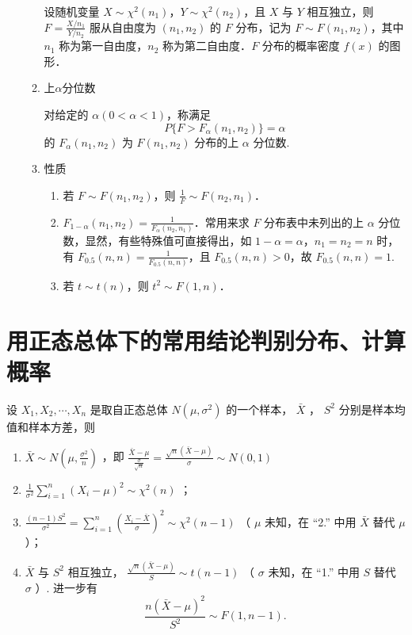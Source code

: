 \begin{enumerate}
\begin{enumerate}
                    设随机变量 $X \sim \chi^2(n_1)$，$Y \sim \chi^2(n_2)$，且 $X$ 与 $Y$ 相互独立，则 $F = \frac{X / n_1}{Y / n_2}$ 服从自由度为 $(n_1, n_2)$ 的 $F$ 分布，记为 $F \sim F(n_1, n_2)$，其中 $n_1$ 称为第一自由度，$n_2$ 称为第二自由度．$F$ 分布的概率密度 $f(x)$ 的图形．
              \item 上$\alpha$分位数

                    对给定的 $\alpha (0 < \alpha < 1)$，称满足
                    $$P\{F > F_\alpha(n_1, n_2)\} = \alpha$$
                    的 $F_\alpha(n_1, n_2)$ 为 $F(n_1, n_2)$ 分布的上 $\alpha$ 分位数.
              \item 性质
                    \begin{enumerate}
                        \item 若 $F \sim F(n_1, n_2)$，则 $\frac{1}{F} \sim F(n_2, n_1)$．
                        \item $F_{1-\alpha}(n_1, n_2) = \frac{1}{F_\alpha(n_2, n_1)}$．常用来求 $F$ 分布表中未列出的上 $\alpha$ 分位数，显然，有些特殊值可直接得出，如 $1-\alpha = \alpha$，$n_1 = n_2 = n$ 时，有 $F_{0.5}(n, n) = \frac{1}{F_{0.5}(n, n)}$，且 $F_{0.5}(n, n) > 0$，故 $F_{0.5}(n, n) = 1$.
                        \item 若 $t \sim t(n)$，则 $t^2 \sim F(1, n)$．
                    \end{enumerate}
          \end{enumerate}
\end{enumerate}
\section{用正态总体下的常用结论判别分布、计算概率}
设 $X_{1}, X_{2}, \cdots, X_{n}$ 是取自正态总体 $N(\mu, \sigma^{2})$ 的一个样本， $\bar{X}$ ， $S^{2}$ 分别是样本均值和样本方差，则

\begin{enumerate}
    \item $\bar{X} \sim N\left(\mu, \frac{\sigma^{2}}{n}\right)$ ，即 $\frac{\bar{X}-\mu}{\frac{\sigma}{\sqrt{n}}} = \frac{\sqrt{n}(\bar{X}-\mu)}{\sigma} \sim N(0,1)$
    \item $\frac{1}{\sigma^{2}} \sum_{i=1}^{n}(X_{i}-\mu)^{2} \sim \chi^{2}(n)$ ；
    \item $\frac{(n-1)S^{2}}{\sigma^{2}} = \sum_{i=1}^{n}\left(\frac{X_{i}-\bar{X}}{\sigma}\right)^{2} \sim \chi^{2}(n-1)$ （ $\mu$ 未知，在 “2.” 中用 $\bar{X}$ 替代 $\mu$ ）；
    \item $\bar{X}$ 与 $S^{2}$ 相互独立， $\frac{\sqrt{n}(\bar{X}-\mu)}{S} \sim t(n-1)$ （ $\sigma$ 未知，在 “1.” 中用 $S$ 替代 $\sigma$ ）. 进一步有
          $$\frac{n(\bar{X}-\mu)^{2}}{S^{2}} \sim F(1, n-1).$$
\end{enumerate}

